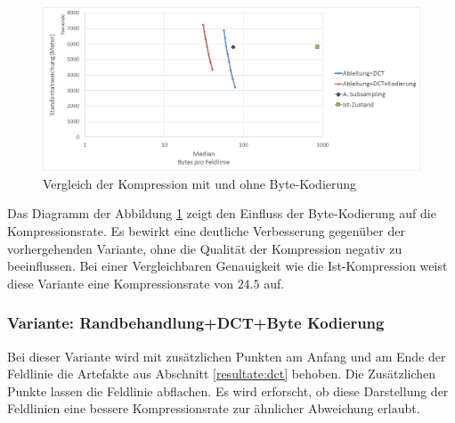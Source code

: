 \begin{figure}[!htbp]
	\center
	\includegraphics[width=1\textwidth,keepaspectratio]{./pictures/resultate/loesung1/loesung1-6/loesung1_6.png}
	\caption{Vergleich der Kompression mit und ohne Byte-Kodierung}
	\label{resultate:loesung1:dct:kodierung}
\end{figure}
Das Diagramm der Abbildung \ref{resultate:loesung1:dct:kodierung} zeigt den Einfluss der Byte-Kodierung auf die Kompressionsrate. Es bewirkt eine deutliche Verbesserung gegenüber der vorhergehenden Variante, ohne die Qualität der Kompression negativ zu beeinflussen. Bei einer Vergleichbaren Genauigkeit wie die Ist-Kompression weist diese Variante eine Kompressionsrate von $24.5$ auf.

\subsubsection{Variante: Randbehandlung+DCT+Byte Kodierung} \label{resultate:loesung1:dct:randbeh+byte}
Bei dieser Variante wird mit zusätzlichen Punkten am Anfang und am Ende der Feldlinie die Artefakte aus Abschnitt \ref{resultate:dct} behoben. Die Zusätzlichen Punkte lassen die Feldlinie abflachen. Es wird erforscht, ob diese Darstellung der Feldlinien eine bessere Kompressionsrate zur ähnlicher Abweichung erlaubt. 

